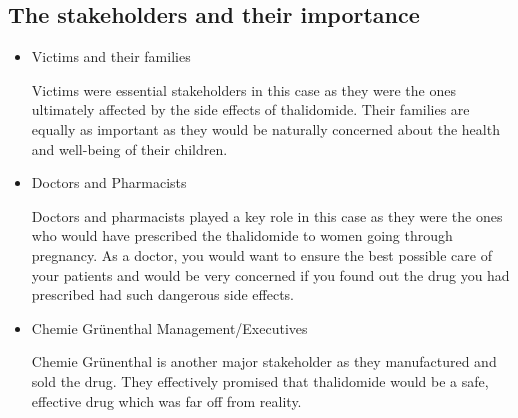 \documentclass[8pt]{article}
\begin{document}
\subsection{The stakeholders and their importance} 
\begin{itemize}
\item Victims and their families

Victims were essential stakeholders in this case as they were the ones ultimately affected by the side effects of thalidomide. Their families are equally as important as they would be naturally concerned about the health and well-being of their children.

\item Doctors and Pharmacists

Doctors and pharmacists played a key role in this case as they were the ones who would have prescribed the thalidomide to women going through pregnancy. As a doctor, you would want to ensure the best possible care of your patients and would be very concerned if you found out the drug you had prescribed had such dangerous side effects.

\item Chemie Gr\"{u}nenthal Management/Executives

Chemie Gr\"{u}nenthal is another major stakeholder as they manufactured and sold the drug. They effectively promised that thalidomide would be a safe, effective drug which was far off from reality.
\end{itemize}
\end{document}
